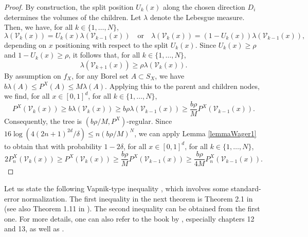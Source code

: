 \documentclass[paper=a4, fontsize=11pt]{scrartcl}
\begin{document}
\begin{proof}
    By construction, the split position $U_k(x)$ along the chosen direction $D_i$ determines the volumes of the children. Let $\lambda$ denote the Lebesgue measure. Then, we have, for all $k\in\{1,\ldots, N\}$,
    $$\lambda(\mathcal{V}_{k}(x)) = U_k(x)  \lambda(\mathcal{V}_{k-1}(x)) \quad \text{or} \quad \lambda(\mathcal{V}_{k}(x)) = (1-U_k(x))  \lambda(\mathcal{V}_{k-1}(x)) , $$
depending on $x$ positioning with respect to the split $U_k(x) $.
 Since $U_k(x) \geq \rho $ and $1- U_k(x) \geq \rho $, it follows that, for all $k\in\{1,\ldots, N\}$, 
    $$\lambda(\mathcal{V}_{k+1}(x)) \geq \rho  \lambda(\mathcal{V}_{k}(x)).$$
By assumption on $f_X$, for any Borel set $A \subset S_X$, we have $b \lambda(A) \leq P^X(A) \leq M \lambda(A)$. Applying this to the parent and children nodes, we find, for all $x\in [0,1]^d $, for all $k \in \{1,\ldots, N \}$,
$$P^X(\mathcal{V}_{k}(x)) \geq b \lambda(\mathcal{V}_{k}(x) ) \geq b \rho \lambda(\mathcal{V}_{k-1}(x)) \geq \frac{b \rho}{M} P^X(\mathcal{V}_{k-1}(x)).$$
Consequently, the tree is $( b\rho / M , P^X)$-regular. Since $16\log( 4 (2n+1)^{2d} / \delta) \leq n (b\rho / M ) ^{N}$, we can apply Lemma \ref{lemmaWager1} to obtain that with probability $1-2\delta$, for all $x\in [0,1]^d $, for all $k \in \{1,\ldots, N \}$,
$$2 P^X_n(\mathcal{V}_{k}(x))  \geq P^X(\mathcal{V}_{k}(x))  \geq \frac{b \rho}{M} P^X(\mathcal{V}_{k-1}(x))\geq \frac{b \rho}{4M} P^X_n(\mathcal{V}_{k-1}(x)) .$$
\end{proof}

Let us state the following Vapnik-type inequality \cite{vapnik2015uniform}, which involves some standard-error normalization. The first inequality in the next theorem is Theorem 2.1 in  \cite{anthony1993result} (see also Theorem 1.11 in  \cite{lugosi2002pattern}). The second inequality can be obtained from the first one. For more details, one can also refer to the book by \cite{boucheron2013concentration}, especially chapters 12 and 13, as well as \cite{devroye96probabilistic}. 
\end{document}

